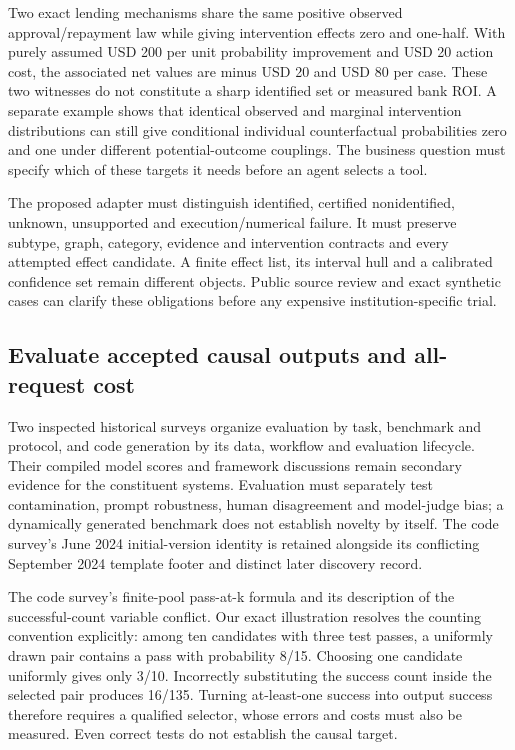 Two exact lending mechanisms share the same positive observed
approval/repayment law while giving intervention effects zero and
one-half. With purely assumed USD 200 per unit probability improvement
and USD 20 action cost, the associated net values are minus USD 20 and
USD 80 per case. These two witnesses do not constitute a sharp
identified set or measured bank ROI. A separate example shows that
identical observed and marginal intervention distributions can still
give conditional individual counterfactual probabilities zero and one
under different potential-outcome couplings. The business question must
specify which of these targets it needs before an agent selects a tool.
\citep{exec19_javaid_reference}

The proposed adapter must distinguish identified, certified
nonidentified, unknown, unsupported and execution/numerical failure. It
must preserve subtype, graph, category, evidence and intervention
contracts and every attempted effect candidate. A finite effect list,
its interval hull and a calibrated confidence set remain different
objects. Public source review and exact synthetic cases can clarify
these obligations before any expensive institution-specific trial.

\hypertarget{evaluate-accepted-causal-outputs-and-all-request-cost}{%
\subsection{Evaluate accepted causal outputs and all-request
cost}\label{evaluate-accepted-causal-outputs-and-all-request-cost}}

Two inspected historical surveys organize evaluation by task, benchmark
and protocol, and code generation by its data, workflow and evaluation
lifecycle. Their compiled model scores and framework discussions remain
secondary evidence for the constituent systems. Evaluation must
separately test contamination, prompt robustness, human disagreement and
model-judge bias; a dynamically generated benchmark does not establish
novelty by itself. The code survey's June 2024 initial-version identity
is retained alongside its conflicting September 2024 template footer and
distinct later discovery record.
\citep{exec19_surveys_evaluation,exec19_surveys_code}

The code survey's finite-pool pass-at-k formula and its description of
the successful-count variable conflict. Our exact illustration resolves
the counting convention explicitly: among ten candidates with three test
passes, a uniformly drawn pair contains a pass with probability 8/15.
Choosing one candidate uniformly gives only 3/10. Incorrectly
substituting the success count inside the selected pair produces 16/135.
Turning at-least-one success into output success therefore requires a
qualified selector, whose errors and costs must also be measured. Even
correct tests do not establish the causal target.
\citep{exec19_surveys_code,exec19_surveys_reference}

